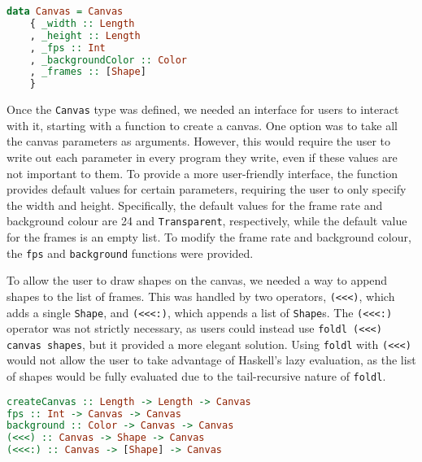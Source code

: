 \documentclass[../main.tex]{subfiles}
\begin{document}
        \begin{lstlisting}[language={Haskell}, label={lst:canvas}, caption={The \texttt{Canvas} type 
            definition.}]
data Canvas = Canvas
    { _width :: Length
    , _height :: Length
    , _fps :: Int
    , _backgroundColor :: Color
    , _frames :: [Shape]
    }\end{lstlisting}

        Once the \texttt{Canvas} type was defined, we needed an interface for users to
            interact with it, starting with a function to create a canvas.
        One option was to take all the canvas parameters as arguments.
        However, this would require the user to write out each parameter in every
            program they write, even if these values are not important to them.
        To provide a more user-friendly interface, the function provides default values
            for certain parameters, requiring the user to only specify the width and
            height.
        Specifically, the default values for the frame rate and background colour are
            24 and \texttt{Transparent}, respectively, while the default value for the
            frames is an empty list.
        To modify the frame rate and background colour, the \texttt{fps} and
            \texttt{background} functions were provided.

        To allow the user to draw shapes on the canvas, we needed a way to append
            shapes to the list of frames.
        This was handled by two operators, \texttt{(<<<)}, which adds a single
            \texttt{Shape}, and \texttt{(<<<:)}, which appends a list of \texttt{Shape}s.
        The \texttt{(<<<:)} operator was not strictly necessary, as users could instead
            use \texttt{foldl (<<<) canvas shapes}, but it provided a more elegant
            solution.
        Using \texttt{foldl} with \texttt{(<<<)} would not allow the user to take
            advantage of Haskell's lazy evaluation, as the list of shapes would be fully
            evaluated due to the tail-recursive nature of \texttt{foldl}.

        \begin{lstlisting}[language={Haskell}, label={lst:fps}, caption={The \texttt{createCanvas}, \texttt{fps} and 
            \texttt{background} functions and the \texttt{(<<<)} and \texttt{(<<<:)} operators.}]
createCanvas :: Length -> Length -> Canvas
fps :: Int -> Canvas -> Canvas
background :: Color -> Canvas -> Canvas
(<<<) :: Canvas -> Shape -> Canvas
(<<<:) :: Canvas -> [Shape] -> Canvas\end{lstlisting}
\end{document}
